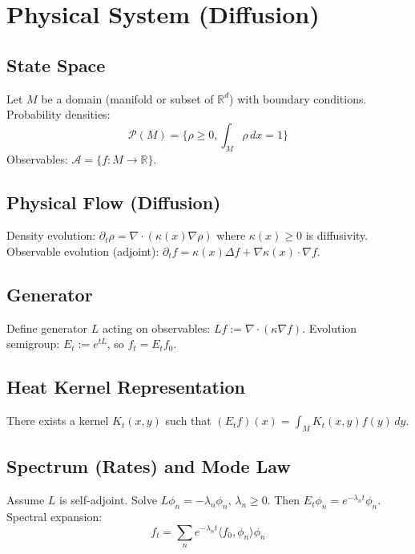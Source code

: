 \documentclass[12pt, oneside]{article}
\begin{document}
\section{Physical System (Diffusion)}

\subsection{State Space}

Let $M$ be a domain (manifold or subset of $\mathbb{R}^d$) with boundary conditions. Probability densities:
\begin{equation}
\mathcal{P}(M) = \{\rho \geq 0, \int_M \rho \, dx = 1\}
\end{equation}
Observables: $\mathcal{A} = \{ f: M \rightarrow \mathbb{R} \}$.

\subsection{Physical Flow (Diffusion)}

Density evolution: $\partial_t \rho = \nabla \cdot (\kappa(x) \nabla \rho)$ where $\kappa(x) \geq 0$ is diffusivity. Observable evolution (adjoint): $\partial_t f = \kappa(x) \Delta f + \nabla \kappa(x) \cdot \nabla f$.

\subsection{Generator}

Define generator $L$ acting on observables: $Lf := \nabla \cdot (\kappa \nabla f)$. Evolution semigroup: $E_t := e^{tL}$, so $f_t = E_t f_0$.

\subsection{Heat Kernel Representation}

There exists a kernel $K_t(x,y)$ such that $(E_t f)(x) = \int_M K_t(x,y) f(y) \, dy$.

\subsection{Spectrum (Rates) and Mode Law}

Assume $L$ is self-adjoint. Solve $L \phi_n = -\lambda_n \phi_n$, $\lambda_n \geq 0$. Then $E_t \phi_n = e^{-\lambda_n t} \phi_n$. Spectral expansion:
\begin{equation}
f_t = \sum_n e^{-\lambda_n t} \langle f_0, \phi_n \rangle \phi_n
\end{equation}
\end{document}
